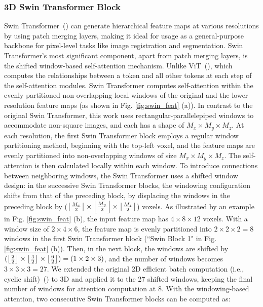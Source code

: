 \documentclass[times,twocolumn,final]{elsarticle}
\DeclarePairedDelimiter\floor{\lfloor}{\rfloor}
\begin{document}
\subsubsection{3D Swin Transformer Block}
Swin Transformer~(\cite{liu2021swin}) can generate hierarchical feature maps at various resolutions by using patch merging layers, making it ideal for usage as a general-purpose backbone for pixel-level tasks like image registration and segmentation. Swin Transformer's most significant component, apart from patch merging layers, is the shifted window-based self-attention mechanism. Unlike ViT~(\cite{dosovitskiy2020image}), which computes the relationships between a token and all other tokens at each step of the self-attention modules. Swin Transformer computes self-attention within the evenly partitioned non-overlapping local windows of the original and the lower resolution feature maps (as shown in Fig. \ref{fig:swin_feat} (a)). In contrast to the original Swin Transformer, this work uses rectangular-parallelepiped windows to accommodate non-square images, and each has a shape of $M_x\times M_y \times M_z$. At each resolution, the first Swin Transformer block employs a regular window partitioning method, beginning with the top-left voxel, and the feature maps are evenly partitioned into non-overlapping windows of size $M_x\times M_y \times M_z$. The self-attention is then calculated locally within each window. To introduce connections between neighboring windows, the Swin Transformer uses a shifted window design: in the successive Swin Transformer blocks, the windowing configuration shifts from that of the preceding block, by displacing the windows in the preceding block by ($\floor*{\frac{M_x}{2}}\times \floor*{\frac{M_y}{2}} \times \floor*{\frac{M_z}{2}}$) voxels. As illustrated by an example in Fig. \ref{fig:swin_feat} (b), the input feature map has $4\times8\times12$ voxels. With a window size of $2\times4\times6$, the feature map is evenly partitioned into $2\times2\times2=8$ windows in the first Swin Transformer block (``Swin Block 1" in Fig. \ref{fig:swin_feat} (b)). Then, in the next block, the windows are shifted by $(\floor*{\frac{2}{2}}\times \floor*{\frac{4}{2}} \times \floor*{\frac{6}{2}})=(1\times2\times3)$, and the number of windows becomes $3\times3\times3=27$. We extended the original 2D efficient batch computation (i.e., cyclic shift)~(\cite{liu2021swin, liu2021video}) to 3D and applied it to the 27 shifted windows, keeping the final number of windows for attention computation at 8. With the windowing-based attention, two consecutive Swin Transformer blocks can be computed as:
\end{document}
